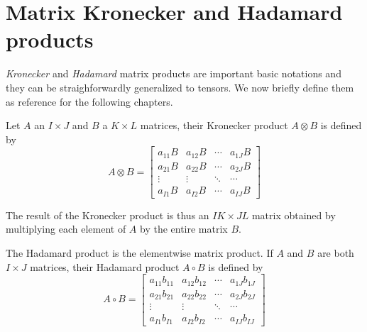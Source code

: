\section{Matrix Kronecker and Hadamard products}
\emph{Kronecker} and \emph{Hadamard} matrix products are important basic notations and they can be straighforwardly generalized to tensors. We now briefly define them as reference for the following chapters.
\begin{Def}
  Let $A$ an $I \times J$ and $B$ a $K \times L$ matrices, their Kronecker product $A \otimes B$ is defined by
  \begin{equation} \label{def:kronecker}
    A \otimes B =
    \begin{bmatrix}
      a_{11}B & a_{12}B & \cdots & a_{1J}B \\
      a_{21}B & a_{22}B & \cdots & a_{2J}B \\
      \vdots & \vdots & \ddots & \cdots \\
      a_{I1}B & a_{I2}B & \cdots & a_{IJ}B
    \end{bmatrix}
  \end{equation}
\end{Def}
The result of the Kronecker product is thus an $IK \times JL$ matrix obtained by multiplying each element of $A$ by the entire matrix $B$.

\begin{Def}
  The Hadamard product is the elementwise matrix product. If $A$ and $B$ are both $I \times J$ matrices, their Hadamard product $A \circ B$ is defined by
  \begin{equation} \label{def:hadamard}
    A \circ B =
    \begin{bmatrix}
      a_{11}b_{11} & a_{12}b_{12} & \cdots & a_{1J}b_{1J} \\
      a_{21}b_{21} & a_{22}b_{22} & \cdots & a_{2J}b_{2J} \\
      \vdots & \vdots & \ddots & \cdots \\
      a_{I1}b_{I1} & a_{I2}b_{I2} & \cdots & a_{IJ}b_{IJ}
    \end{bmatrix}
  \end{equation}
\end{Def}

